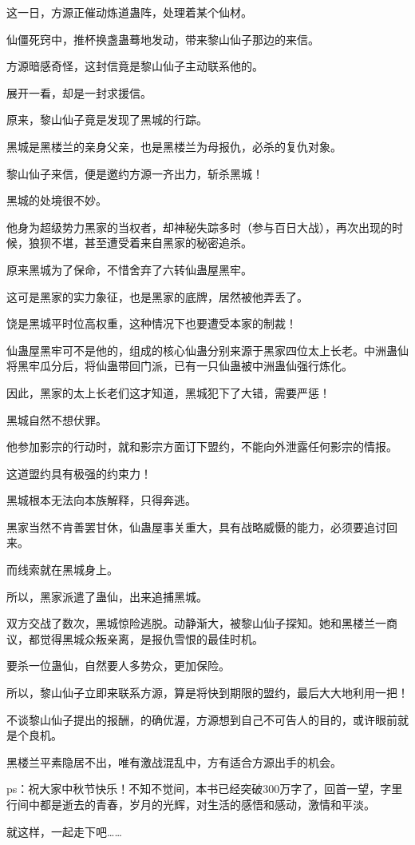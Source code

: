 \begin{this_body}
这一日，方源正催动炼道蛊阵，处理着某个仙材。

仙僵死窍中，推杯换盏蛊蓦地发动，带来黎山仙子那边的来信。

方源暗感奇怪，这封信竟是黎山仙子主动联系他的。

展开一看，却是一封求援信。

原来，黎山仙子竟是发现了黑城的行踪。

黑城是黑楼兰的亲身父亲，也是黑楼兰为母报仇，必杀的复仇对象。

黎山仙子来信，便是邀约方源一齐出力，斩杀黑城！

黑城的处境很不妙。

他身为超级势力黑家的当权者，却神秘失踪多时（参与百日大战），再次出现的时候，狼狈不堪，甚至遭受着来自黑家的秘密追杀。

原来黑城为了保命，不惜舍弃了六转仙蛊屋黑牢。

这可是黑家的实力象征，也是黑家的底牌，居然被他弄丢了。

饶是黑城平时位高权重，这种情况下也要遭受本家的制裁！

仙蛊屋黑牢可不是他的，组成的核心仙蛊分别来源于黑家四位太上长老。中洲蛊仙将黑牢瓜分后，将仙蛊带回门派，已有一只仙蛊被中洲蛊仙强行炼化。

因此，黑家的太上长老们这才知道，黑城犯下了大错，需要严惩！

黑城自然不想伏罪。

他参加影宗的行动时，就和影宗方面订下盟约，不能向外泄露任何影宗的情报。

这道盟约具有极强的约束力！

黑城根本无法向本族解释，只得奔逃。

黑家当然不肯善罢甘休，仙蛊屋事关重大，具有战略威慑的能力，必须要追讨回来。

而线索就在黑城身上。

所以，黑家派遣了蛊仙，出来追捕黑城。

双方交战了数次，黑城惊险逃脱。动静渐大，被黎山仙子探知。她和黑楼兰一商议，都觉得黑城众叛亲离，是报仇雪恨的最佳时机。

要杀一位蛊仙，自然要人多势众，更加保险。

所以，黎山仙子立即来联系方源，算是将快到期限的盟约，最后大大地利用一把！

不谈黎山仙子提出的报酬，的确优渥，方源想到自己不可告人的目的，或许眼前就是个良机。

黑楼兰平素隐居不出，唯有激战混乱中，方有适合方源出手的机会。

ps：祝大家中秋节快乐！不知不觉间，本书已经突破300万字了，回首一望，字里行间中都是逝去的青春，岁月的光辉，对生活的感悟和感动，激情和平淡。

就这样，一起走下吧……

\end{this_body}

